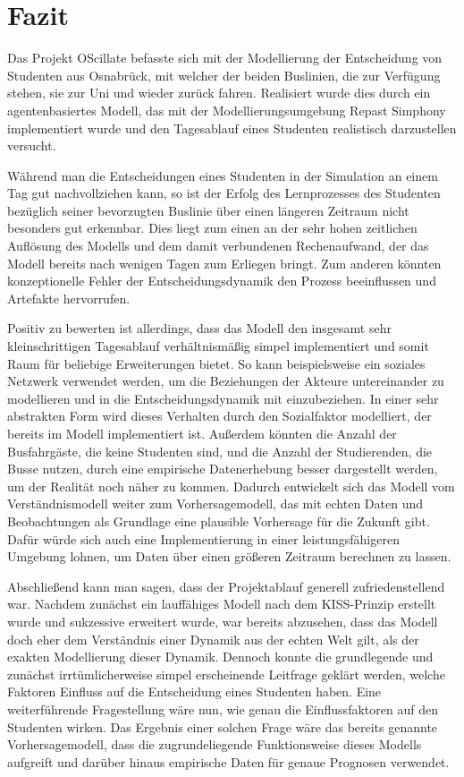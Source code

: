 \documentclass[12pt,a4paper]{scrartcl}
\begin{document}
\newpage

\section{Fazit}\label{fazit}
Das Projekt OScillate befasste sich mit der Modellierung der Entscheidung von Studenten aus Osnabrück, mit welcher der beiden Buslinien, die zur Verfügung stehen, sie zur Uni und wieder zurück fahren. Realisiert wurde dies durch ein agentenbasiertes Modell, das mit der Modellierungsumgebung Repast Simphony implementiert wurde und den Tagesablauf eines Studenten realistisch darzustellen versucht. 

Während man die Entscheidungen eines Studenten in der Simulation an einem Tag gut nachvollziehen kann, so ist der Erfolg des Lernprozesses des Studenten bezüglich seiner bevorzugten Buslinie über einen längeren Zeitraum nicht besonders gut erkennbar. Dies liegt zum einen an der sehr hohen zeitlichen Auflösung des Modells und dem damit verbundenen Rechenaufwand, der das Modell bereits nach wenigen Tagen zum Erliegen bringt. Zum anderen könnten konzeptionelle Fehler der Entscheidungsdynamik den Prozess beeinflussen und Artefakte hervorrufen. 

Positiv zu bewerten ist allerdings, dass das Modell den insgesamt sehr kleinschrittigen Tagesablauf verhältnismäßig simpel implementiert und somit Raum für beliebige Erweiterungen bietet. So kann beispielsweise ein soziales Netzwerk verwendet werden, um die Beziehungen der Akteure untereinander zu modellieren und in die Entscheidungsdynamik mit einzubeziehen. In einer sehr abstrakten Form wird dieses Verhalten durch den Sozialfaktor modelliert, der bereits im Modell implementiert ist. Außerdem könnten die Anzahl der Busfahrgäste, die keine Studenten sind, und die Anzahl der Studierenden, die Busse nutzen, durch eine empirische Datenerhebung besser dargestellt werden, um der Realität noch näher zu kommen. Dadurch entwickelt sich das Modell vom Verständnismodell weiter zum Vorhersagemodell, das mit echten Daten und Beobachtungen als Grundlage eine plausible Vorhersage für die Zukunft gibt. Dafür würde sich auch eine Implementierung in einer leistungsfähigeren Umgebung lohnen, um Daten über einen größeren Zeitraum berechnen zu lassen. 

Abschließend kann man sagen, dass der Projektablauf generell zufriedenstellend war. Nachdem zunächst ein lauffähiges Modell nach dem KISS-Prinzip erstellt wurde und sukzessive erweitert wurde, war bereits abzusehen, dass das Modell doch eher dem Verständnis einer Dynamik aus der echten Welt gilt, als der exakten Modellierung dieser Dynamik. Dennoch konnte die grundlegende und zunächst irrtümlicherweise simpel erscheinende Leitfrage geklärt werden, welche Faktoren Einfluss auf die Entscheidung eines Studenten haben. 
Eine weiterführende Fragestellung wäre nun, wie genau die Einflussfaktoren auf den Studenten wirken. Das Ergebnis einer solchen Frage wäre das bereits genannte Vorhersagemodell, dass die zugrundeliegende Funktionsweise dieses Modells aufgreift und darüber hinaus empirische Daten für genaue Prognosen verwendet.
\end{document}
